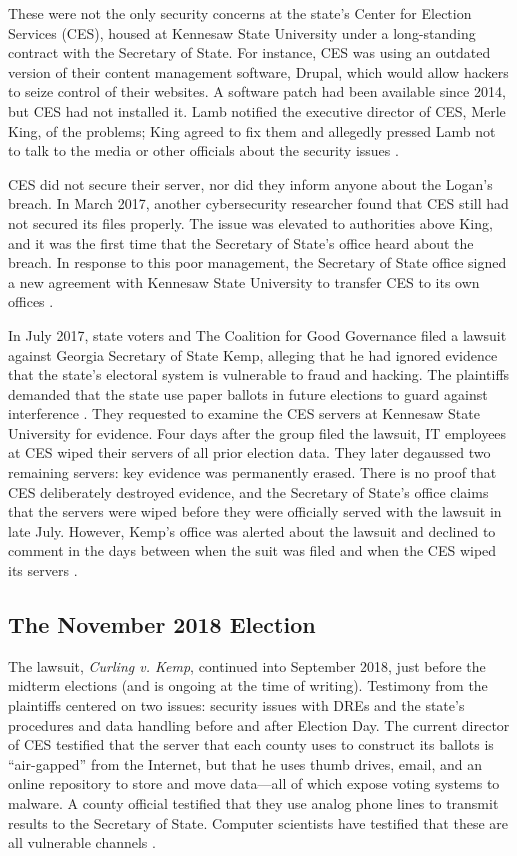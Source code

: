 \documentclass[runningheads]{llncs}
\begin{document}
These were not the only security concerns at the state's Center for Election Services (CES),
housed at Kennesaw State University under a long-standing contract with the Secretary of State.
For instance, CES was using an outdated version of their content management software, Drupal, which would allow hackers to seize control of their websites.
A software patch had been available since 2014, but CES had not installed it.
Lamb notified the executive director of CES, Merle King, of the problems;
King agreed to fix them and allegedly pressed Lamb not to talk to the media or other officials about the
security issues \cite{zetter_will_2017}.

CES did not secure their server, nor did they inform anyone about the Logan's breach.
In March 2017, another cybersecurity researcher found that CES still had not secured its files properly.
The issue was elevated to authorities above King, 
and it was the first time that the Secretary of State's office heard about the breach.
In response to this poor management, the Secretary of State office signed a new agreement with Kennesaw State
University to transfer CES to its own offices \cite{zetter_will_2017}.

In July 2017, state voters and The Coalition for Good Governance filed a lawsuit against Georgia Secretary
of State Kemp, alleging that he had ignored evidence that the state's electoral system is vulnerable to fraud and hacking.
The plaintiffs demanded that the state use paper ballots in future elections to guard against interference \cite{curling_kemp_2018,curling_kemp_amicus_2018}.
They requested to examine the CES servers at Kennesaw State University for evidence.
Four days after the group filed the lawsuit, IT employees at CES wiped their servers of all prior election data.
They later degaussed two remaining servers: key evidence was permanently erased.
There is no proof that CES deliberately destroyed evidence, and the Secretary of
State's office claims that the servers were wiped before they were officially served with the lawsuit in late July.
However, Kemp's office was alerted about the lawsuit and declined to comment in the days between when the suit was filed
and when the CES wiped its servers \cite{stahl_georgia_2017}.

\subsection{The November 2018 Election}

The lawsuit, \emph{Curling v. Kemp}, continued into September 2018, just before the midterm elections (and is ongoing at the time of writing).
Testimony from the plaintiffs centered on two issues:
security issues with DREs and the state's procedures and data handling before and after Election Day.
The current director of CES testified that the server that each county uses to construct its ballots is 
``air-gapped'' from the Internet, but that he uses thumb drives, email, and an online repository to store and move data---all of which expose voting systems to malware.
A county official testified that they use analog phone lines to transmit results to the Secretary of State.
Computer scientists have testified that these are all vulnerable channels \cite{nakashima_georgia_2018}.
\end{document}
